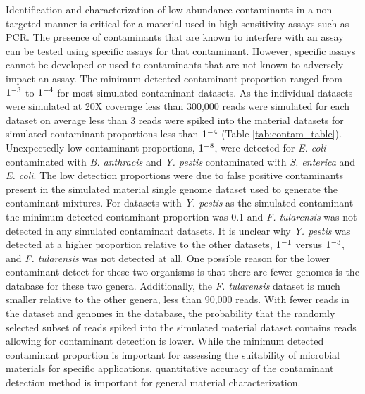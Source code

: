 \documentclass[fleqn,10pt,lineno]{wlpeerj}\usepackage[]{graphicx}\usepackage[]{color}
\begin{document}
Identification and characterization of low abundance contaminants in a non-targeted manner is critical for a material used in high sensitivity assays such as PCR.  
The presence of contaminants that are known to interfere with an assay can be tested using specific assays for that contaminant. 
However, specific assays cannot be developed or used to contaminants that are not known to adversely impact an assay. 
The minimum detected contaminant proportion ranged from $1 \time 10^{-3}$ to $1 \time 10^{-4}$ for most simulated contaminant datasets. 
As the individual datasets were simulated at 20X coverage less than 300,000 reads were simulated for each dataset on average less than 3 reads were spiked into the material datasets for simulated contaminant proportions less than $1 \time 10^{-4}$ (Table \ref{tab:contam_table}). 
Unexpectedly low contaminant proportions, $1 \time 10^{-8}$, were detected for \textit{E. coli} contaminated with \textit{B. anthracis} and \textit{Y. pestis} contaminated with \textit{S. enterica} and \textit{E. coli}. 
The low detection proportions were due to false positive contaminants present in the simulated material single genome dataset used to generate the contaminant mixtures. 
For datasets with \textit{Y. pestis} as the simulated contaminant the minimum detected contaminant proportion was 0.1 and \textit{F. tularensis} was not detected in any simulated contaminant datasets. 
It is unclear why \textit{Y. pestis} was detected at a higher proportion relative to the other datasets, $1 \time 10^{-1}$ versus $1 \time 10^{-3}$, and \textit{F. tularensis} was not detected at all. 
One possible reason for the lower contaminant detect for these two organisms is that there are fewer genomes is the database for these two genera. 
Additionally, the \textit{F. tularensis} dataset is much smaller relative to the other genera, less than 90,000 reads. 
With fewer reads in the dataset and genomes in the database, the probability that the randomly selected subset of reads spiked into the simulated material dataset contains reads allowing for contaminant detection is lower. 
While the minimum detected contaminant proportion is important for assessing the suitability of microbial materials for specific applications, quantitative accuracy of the contaminant detection method is important for general material characterization.
\end{document}
